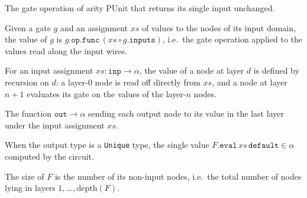 \begin{definition}
\label{BoolCircuit.FeedForward.GateOp.id}
\leanok
The gate operation of arity $\mathrm{PUnit}$ that returns its single input
unchanged.
\end{definition}

\begin{definition}
\label{BoolCircuit.FeedForward.Gate.eval}
\leanok
{}
Given a gate $g$ and an assignment $xs$ of values to the nodes of its input domain,
the value of $g$ is $g.\texttt{op}.\texttt{func}\,(xs \circ g.\texttt{inputs})$, i.e.\
the gate operation applied to the values read along the input wires.
\end{definition}

\begin{definition}
\label{BoolCircuit.FeedForward.evalNode}
\leanok
{}
For an input assignment $xs : \texttt{inp} \to \alpha$, the value of a node at layer
$d$ is defined by recursion on $d$: a layer-$0$ node is read off directly from $xs$,
and a node at layer $n+1$ evaluates its gate on the values of the layer-$n$ nodes.
\end{definition}

\begin{definition}
\label{BoolCircuit.FeedForward.eval}
\leanok
{}
The function $\texttt{out} \to \alpha$ sending each output node to its value in the
last layer under the input assignment $xs$.
\end{definition}

\begin{definition}
\label{BoolCircuit.FeedForward.eval₁}
\leanok
{}
When the output type is a \texttt{Unique} type, the single value
$F.\texttt{eval}\,xs\,\texttt{default} \in \alpha$ computed by the circuit.
\end{definition}

\begin{definition}
\label{BoolCircuit.FeedForward.size}
\leanok
The size of $F$ is the number of its non-input nodes, i.e.\ the total number of
nodes lying in layers $1, \dots, \mathrm{depth}(F)$.
\end{definition}

